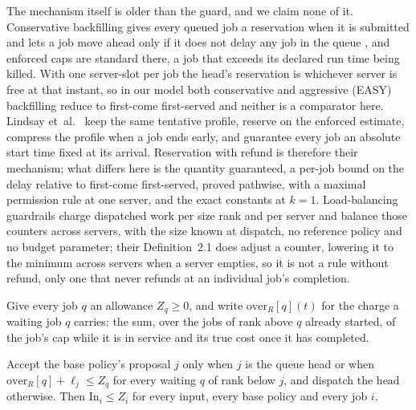 The mechanism itself is older than the guard, and we claim none of it. Conservative
backfilling gives every queued job a reservation when it is submitted and lets a job move
ahead only if it does not delay any job in the queue \cite{mualem2001backfilling}, and
enforced caps are standard there, a job that exceeds its declared run time being killed.
With one server-slot per job the head's reservation is whichever server is free at that
instant, so in our model both conservative and aggressive (EASY) backfilling reduce to
first-come first-served and neither is a comparator here. Lindsay
et~al.~\cite{lindsay2013backfilling} keep the same tentative profile, reserve on the
enforced estimate, compress the profile when a job ends early, and guarantee every job an
absolute start time fixed at its arrival. Reservation with refund is therefore their
mechanism; what differs here is the quantity guaranteed, a per-job bound on the delay
relative to first-come first-served, proved pathwise, with a maximal permission rule at
one server, and the exact constants at $k=1$. Load-balancing guardrails
\cite{grosof2019guardrails} charge dispatched work per size rank and per server and
balance those counters across servers, with the size known at dispatch, no reference
policy and no budget parameter; their Definition~2.1 does adjust a counter, lowering it
to the minimum across servers when a server empties, so it is not a rule without refund,
only one that never refunds at an individual job's completion.

Give every job $q$ an allowance $Z_q\geq0$, and write $\mathrm{over}_R[q](t)$ for the
charge a waiting job $q$ carries: the sum, over the jobs of rank above $q$ already
started, of the job's cap while it is in service and its true cost once it has completed.

\begin{proposition}
\label{prop:supp_reservation_in}
Accept the base policy's proposal $j$ only when $j$ is the queue head or when
$\mathrm{over}_R[q]+\ell_j \le Z_q$ for every waiting $q$ of rank below $j$, and dispatch
the head otherwise. Then $\mathrm{In}_i \le Z_i$ for every input, every base policy and
every job $i$.
\end{proposition}

